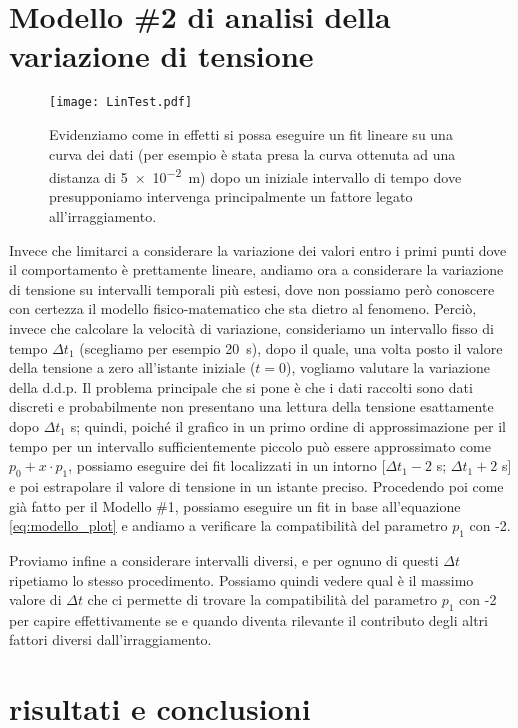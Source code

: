 \documentclass[
    rmp,
    reprint, 
    superscriptaddress, 
    altaffilletter, 
    amsmath, 
    amssymb,
    a4paper]{revtex4-2}
\begin{document}
\section*{Modello \#2 di analisi della variazione di tensione}

\begin{figure}
    \texttt{[image: LinTest.pdf]}
    \caption{Evidenziamo come in effetti si possa eseguire un fit lineare su una curva dei dati (per esempio è stata presa la curva ottenuta ad una distanza di \SI{5e-2}{\metre}) dopo un iniziale intervallo di tempo dove presupponiamo intervenga principalmente un fattore legato all'irraggiamento. }
    \label{fig:plot:linear}
\end{figure}

Invece che limitarci a considerare la variazione dei valori entro i primi punti dove il comportamento è prettamente lineare, andiamo ora a considerare la variazione di tensione su intervalli temporali più estesi, dove non possiamo però conoscere con certezza il modello fisico-matematico che sta dietro al fenomeno. Perciò, invece che calcolare la velocità di variazione, consideriamo un intervallo fisso di tempo $\Delta t_1$ (scegliamo per esempio \SI{20}{\second}), dopo il quale, una volta posto il valore della tensione a zero all'istante iniziale ($t=0$), vogliamo valutare la variazione della d.d.p. Il problema principale che si pone è che i dati raccolti sono dati discreti e probabilmente non presentano una lettura della tensione esattamente dopo $\Delta t_1$ s; quindi, poiché il grafico in un primo ordine di approssimazione per il tempo per un intervallo sufficientemente piccolo può essere approssimato come $p_0+x\cdot p_1$, possiamo eseguire dei fit localizzati in un intorno [$\Delta t_1-2$ s; $\Delta t_1+2$ s] e poi estrapolare il valore di tensione in un istante preciso. Procedendo poi come già fatto per il Modello \#1, possiamo eseguire un fit in base all'equazione \ref{eq:modello_plot} e andiamo a verificare la compatibilità del parametro $p_1$ con -2.

Proviamo infine a considerare intervalli diversi, e per ognuno di questi $\Delta t$ ripetiamo lo stesso procedimento. Possiamo quindi vedere qual è il massimo valore di $\Delta t $ che ci permette di trovare la compatibilità del parametro $p_1$ con -2 per capire effettivamente se e quando diventa rilevante il contributo degli altri fattori diversi dall'irraggiamento.

\section*{risultati e conclusioni}
\end{document}
